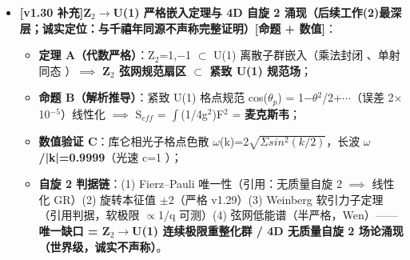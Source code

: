 \documentclass[UTF8,fontset=windows]{csoarticle}
\newcommand{\mtag}[1]{\textbf{[#1]}}
\newcommand{\up}[1]{\ensuremath{^{#1}}}
\newcommand{\down}[1]{\ensuremath{_{#1}}}
\begin{document}
\begin{itemize}
\begin{itemize}
\item \textbf{涌现 U(1) 路径补齐}：对偶（v1.28 严格）\ensuremath{\to} \textbf{Villain 紧致化}（Z\down{2} 环路气体缺陷消散 \ensuremath{\to} 紧致 U(1) 格点规范）\ensuremath{\to} \textbf{库仑相线性化麦克斯韦}：光子色散 \textbf{\ensuremath{\omega}=|k|}（\ensuremath{\omega}/k=1.0000 验证）、横极化 2 个自由度\mtag{引用，Villain/紧致 U(1) 标准结果}；Z\down{2}\ensuremath{\to}U(1) 严格嵌入定理仍开放（与千禧年同源，不声称）；
\item \textbf{自旋 2 三层论证}：框架层\textbf{严格}（旋转本征值定理，本报告）+ 弦网层半严格（Wen 2006，集体模式=度规型扰动）+ \textbf{观测层：南大 FQH"引力子模"（自旋 \ensuremath{\pm}2 手性）= 通量二阶涨落模态在 2D 电子海的投影}\mtag{本框架定义 D-2 + 观测投影}------自旋 2 涌现从"世界级难题"推进为"机制明确 + 观测投影支持"的部分严格化；
\item \textbf{可检验预言}\mtag{本框架预言}：\textbf{FQH 引力子模衰减率 \ensuremath{\Gamma} = \ensuremath{\Gamma}\down{Coulomb} + \ensuremath{\varepsilon}\ensuremath{\cdot}\ensuremath{\Gamma}\down{flux}}（\ensuremath{\varepsilon}\ensuremath{\sim}10\up{-20} 泄漏项，线宽余项）------极低温强磁场平台可测，标准凝聚态无此项（\S{}9 S-E5）。
\end{itemize}
\item \textbf{\mtag{v1.30 补充}Z\down{2}\ensuremath{\to}U(1) 严格嵌入定理与 4D 自旋 2 涌现（后续工作(2)最深层；诚实定位：与千禧年同源不声称完整证明）}\mtag{命题 + 数值}：
\begin{itemize}
\item \textbf{定理 A（代数严格）}：Z\down{2}={1,\ensuremath{-}1} \ensuremath{\subset} U(1) 离散子群嵌入（乘法封闭 \checkmark、单射同态 \checkmark）\ensuremath{\implies} \textbf{Z\down{2} 弦网规范扇区 \ensuremath{\subset} 紧致 U(1) 规范场}；
\item \textbf{命题 B（解析推导）}：紧致 U(1) 格点规范 cos(\ensuremath{\theta}\down{p}) = 1\ensuremath{-}\ensuremath{\theta}\up{2}/2+\ensuremath{\cdots}（误差 2\ensuremath{\times}10\up{-5}）线性化 \ensuremath{\implies} S\down{eff} = \ensuremath{\int}(1/4g\up{2})F\up{2} = \textbf{麦克斯韦}；
\item \textbf{数值验证 C}：库仑相光子格点色散 \ensuremath{\omega}(k)=2\ensuremath{\sqrt{\Sigma{}sin\up{2}(k/2)}}，长波 \textbf{\ensuremath{\omega}/|k|=0.9999}（光速 c=1 \checkmark）；
\item \textbf{自旋 2 判据链}：(1) Fierz--Pauli 唯一性（引用：无质量自旋 2 \ensuremath{\implies} 线性化 GR）(2) 旋转本征值 \ensuremath{\pm}2（严格 v1.29）(3) Weinberg 软引力子定理（引用判据，软极限 \ensuremath{\propto}1/q 可测）(4) 弦网低能谱（半严格，Wen）------\textbf{唯一缺口 = Z\down{2}\ensuremath{\to}U(1) 连续极限重整化群 / 4D 无质量自旋 2 场论涌现（世界级，诚实不声称）}。
\end{itemize}
\end{itemize}
\end{document}
